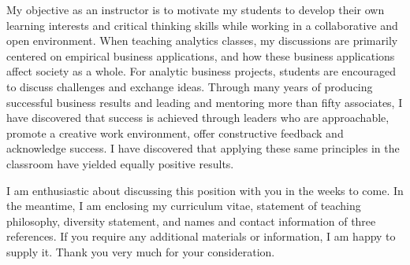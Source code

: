 

\vspace{2.0ex}

My objective as an instructor is to motivate my students to develop their own learning interests and critical thinking skills while working in a collaborative and open environment.  When teaching analytics classes, my discussions are primarily centered on empirical business applications, and how these business applications affect society as a whole.  For analytic business projects, students are encouraged to discuss challenges and exchange ideas.  Through many years of producing successful business results and leading and mentoring more than fifty associates, I have discovered that success is achieved through leaders who are approachable, promote a creative work environment, offer constructive feedback and acknowledge success.  I have discovered that applying these same principles in the classroom have yielded equally positive results.  \\

\vspace{2.0ex}

I am enthusiastic about discussing this position with you in the weeks to come. In the meantime, I am enclosing my curriculum vitae, statement of teaching philosophy, diversity statement, and names and contact information of three references.  If you require any additional materials or information, I am happy to supply it. Thank you very much for your consideration. \\


